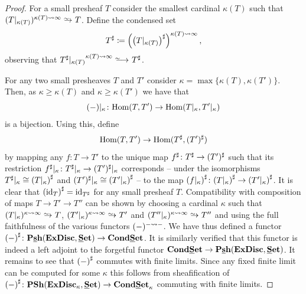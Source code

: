 \begin{proof}
	For a small presheaf $T$ consider the smallest cardinal $\kappa(T)$ such that $(T\resTo{\kappa(T)})^\enlargementsymbol{\kappa(T)}{\infty} \shortisorightarrow T$. Define the condensed set
	$$T^\sheafificationsymbol\ldef \left(\sheafification{T\resTo{\kappa(T)}}\right)^\enlargementsymbol{\kappa(T)}{\infty},$$
	observing that $T^\sheafificationsymbol\resTo{\kappa(T)}^\enlargementsymbol{\kappa(T)}{\infty} \isorightarrow T^\sheafificationsymbol$.
	
	For any two small presheaves $T$ and $T'$ consider $\kappa = \max\{\kappa(T), \kappa(T')\}$. Then, as $\kappa\ge\kappa(T)$ and $\kappa\ge \kappa(T')$ we have that
		$$(-){\vert_{\kappa}}\colon {\operatorname{Hom}}(T,T') \to {\operatorname{Hom}}(T {\vert_{\kappa}}, T'{\vert_{\kappa}})$$
	is a bijection.	Using this, define
	$${\operatorname{Hom}}(T, T')\to {\operatorname{Hom}}(T^\sharp, (T')^\sharp)$$
	by mapping any $f\colon T\to T'$ to the unique map $f^\sharp\colon T^\sharp \to (T')^\sharp$ such that its restriction $f^\sharp{\vert_{\kappa}}\colon T^\sharp{\vert_{\kappa}}\to (T')^\sharp{\vert_{\kappa}}$ corresponds -- under the isomorphisms $T^\sheafificationsymbol \resTo{\kappa} \cong \sheafification{T\resTo{\kappa}}$ and $(T')^\sheafificationsymbol \resTo{\kappa} \cong \sheafification{T'\resTo{\kappa}}$ -- to the map $\sheafification{f\resTo{\kappa}}\colon \sheafification{T\resTo{\kappa}}\to \sheafification{T'\resTo{\kappa}}$. It is clear that $\sheafification{\id_T} = \id_{T^\sheafificationsymbol}$ for any small presheaf $T$. Compatibility with composition of maps $T\to T' \to T''$ can be shown by choosing a cardinal $\kappa$ such that $(T\resTo{\kappa})^\enlargementsymbol{\kappa}{\infty}\shortisorightarrow T$, $(T'\resTo{\kappa})^\enlargementsymbol{\kappa}{\infty}\shortisorightarrow T'$ and $(T''\resTo{\kappa})^\enlargementsymbol{\kappa}{\infty}\shortisorightarrow T''$ and using the full faithfulness of the various functors $(-)^{-\rightsquigarrow -}$. We have thus defined a functor $\sheafification{-}\colon \smallPresheaves{\extremallyDisconnectedSets}{\Set}\to\condensedSets$. It is similarly verified that this functor is indeed a left adjoint to the forgetful functor $\condensedSets\to\smallPresheaves{\extremallyDisconnectedSets}{\Set}$. It remains to see that $\sheafification{-}$ commutes with finite limits. Since any fixed finite limit can be computed for some $\kappa$ this follows from sheafification of $\sheafification{-}\colon \Presheaves{\boundedExtremallyDisconnectedSets{\kappa}}{\Set} \to \boundedCondensedSets{\kappa}$ commuting with finite limits.
\end{proof}


